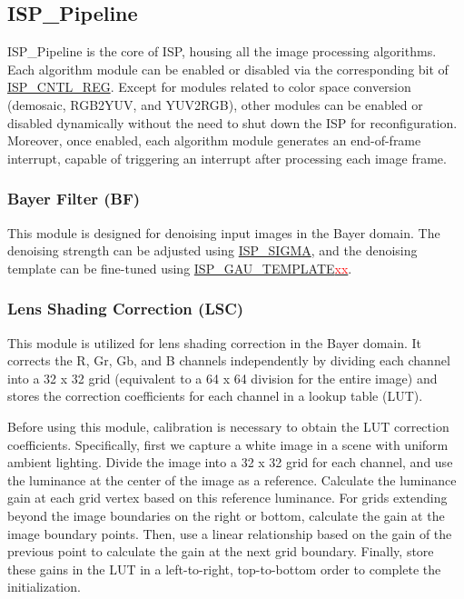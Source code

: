 \documentclass[main\_\_EN.tex]{subfiles}
\begin{document}
\subsection{ISP\_Pipeline}
\label{sec:isp_pipeline}
ISP\_Pipeline is the core of ISP, housing all the image processing algorithms. Each algorithm module can be enabled or disabled via the corresponding bit of \hyperref[regdesc:ISPCNTLREG]{ISP\_CNTL\_REG}. Except for modules related to color space conversion (demosaic, RGB2YUV, and YUV2RGB), other modules can be enabled or disabled dynamically without the need to shut down the ISP for reconfiguration. Moreover, once enabled, each algorithm module generates an end-of-frame interrupt, capable of triggering an interrupt after processing each image frame.


\subsubsection{Bayer Filter (BF)}
\label{sec:isp_bf}
This module is designed for denoising input images in the Bayer domain. The denoising strength can be adjusted using \hyperref[fielddesc:ISPSIGMA]{ISP\_SIGMA}, and the denoising template can be fine-tuned using \hyperref[fielddesc:ISPGAUTEMPLATE00]{ISP\_GAU\_TEMPLATE\textcolor{red}{xx}}.


\subsubsection{Lens Shading Correction (LSC)}
\label{sec:isp_lsc}
This module is utilized for lens shading correction in the Bayer domain. It corrects the R, Gr, Gb, and B channels independently by dividing each channel into a 32 x 32 grid (equivalent to a 64 x 64 division for the entire image) and stores the correction coefficients for each channel in a lookup table (LUT).

Before using this module, calibration is necessary to obtain the LUT correction coefficients. Specifically, first we capture a white image in a scene with uniform ambient lighting. Divide the image into a 32 x 32 grid for each channel, and use the luminance at the center of the image as a reference. Calculate the luminance gain at each grid vertex based on this reference luminance. For grids extending beyond the image boundaries on the right or bottom, calculate the gain at the image boundary points. Then, use a linear relationship based on the gain of the previous point to calculate the gain at the next grid boundary. Finally, store these gains in the LUT in a left-to-right, top-to-bottom order to complete the initialization.
\end{document}
